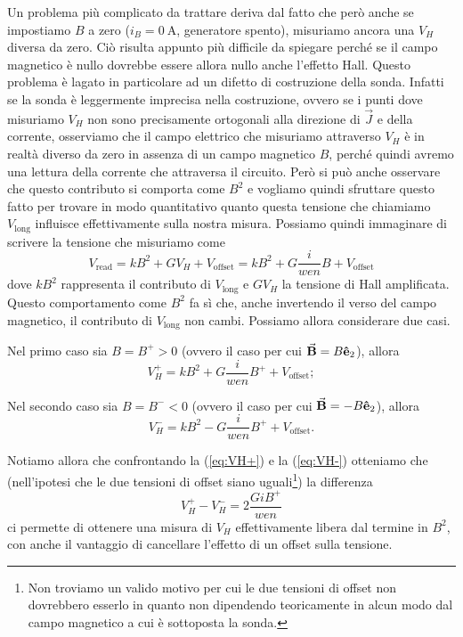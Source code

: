 \documentclass[
    prl,
    reprint, 
    superscriptaddress, 
    altaffilletter, 
    amsmath, 
    amssymb, 
    a4paper,
    varvw]{revtex4-2}
\begin{document}
Un problema più complicato da trattare deriva dal fatto che però anche se impostiamo $B$ a zero ($i_B=\SI{0}{\ampere}$, generatore spento), misuriamo ancora una $V_H$ diversa da zero. Ciò risulta appunto più difficile da spiegare perché se il campo magnetico è nullo dovrebbe essere allora nullo anche l'effetto Hall. Questo problema è lagato in particolare ad un difetto di costruzione della sonda. Infatti se la sonda è leggermente imprecisa nella costruzione, ovvero se i punti dove misuriamo $V_H$ non sono precisamente ortogonali alla direzione di $\vec{J}$ e della corrente, osserviamo che il campo elettrico che misuriamo attraverso $V_H$ è in realtà diverso da zero in assenza di un campo magnetico $B$, perché quindi avremo una lettura della corrente che attraversa il circuito. Però si può anche osservare che questo contributo si comporta come $B^2$ e vogliamo quindi sfruttare questo fatto per trovare in modo quantitativo quanto questa tensione che chiamiamo $V_\text{long}$ influisce effettivamente sulla nostra misura. 
Possiamo quindi immaginare di scrivere la tensione che misuriamo come \begin{equation}
    V_\text{read} = kB^2 +  GV_H + V_\text{offset} = kB^2 + G\frac{i}{wen}B + V_\text{offset}
\end{equation}
dove $kB^2$ rappresenta il contributo di $V_\text{long}$ e $GV_H$ la tensione di Hall amplificata.
Questo comportamento come $B^2$ fa sì che, anche invertendo il verso del campo magnetico, il contributo di $V_\text{long}$ non cambi.
Possiamo allora considerare due casi. 

Nel primo caso sia $B=B^+>0$ (ovvero il caso per cui $\va{B} = B\vu{e}_2$), allora \begin{equation}
    V_H^+ = kB^2 + G\frac{i}{wen}B^+ + V_\text{offset};\label{eq:VH+}
\end{equation}

Nel secondo caso sia $B=B^-<0$ (ovvero il caso per cui $\va{B} = -B\vu{e}_2$), allora \begin{equation}
    V_H^- = kB^2 - G\frac{i}{wen}B^+ + V_\text{offset}.\label{eq:VH-}
\end{equation}

Notiamo allora che confrontando la (\ref{eq:VH+}) e la (\ref{eq:VH-}) otteniamo che (nell'ipotesi che le due tensioni di offset siano uguali\footnote{Non troviamo un valido motivo per cui le due tensioni di offset non dovrebbero esserlo in quanto non dipendendo teoricamente in alcun modo dal campo magnetico a cui è sottoposta la sonda.}) la differenza \begin{equation}
    V_H^+ - V_H^- = 2\frac{GiB^+}{wen}
\end{equation} ci permette di ottenere una misura di $V_H$ effettivamente libera dal termine in $B^2$, con anche il vantaggio di cancellare l'effetto di un offset sulla tensione.
\end{document}
